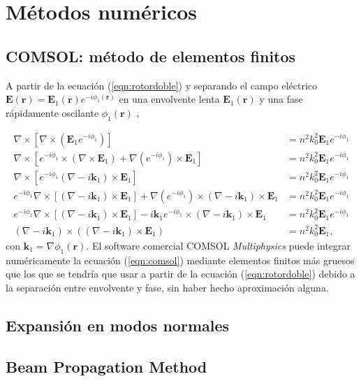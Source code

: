 \chapter{Métodos numéricos}
\section{COMSOL: método de elementos finitos}
A partir de la ecuación (\ref{eqn:rotordoble}) y separando el campo eléctrico $\textbf{E}(\textbf{r}) = \textbf{E}_1(\textbf{r}) e^{-i \phi_1 (\textbf{r})}$ en una envolvente lenta $\textbf{E}_1(\textbf{r})$ y una fase rápidamente oscilante $\phi_1 (\textbf{r})$ ,

\begin{align}
\nabla\times[\nabla\times(\textbf{E}_1 e^{-i \phi_1 })] &=  n^2k_0^2 \textbf{E}_1 e^{-i \phi_1} \nonumber
\\
\nabla\times[ e^{-i \phi_1} \times (\nabla \times \textbf{E}_1) + \nabla(e^{-i \phi_1})\times \textbf{E}_1] &=  n^2k_0^2 \textbf{E}_1 e^{-i \phi_1}\nonumber
\\
\nabla\times[ e^{-i \phi_1}  (\nabla  - i  \textbf{k} _1)\times\textbf{E}_1  ] &=  n^2k_0^2 \textbf{E}_1 e^{-i \phi_1}\nonumber
\\
e^{-i \phi_1}  \nabla\times[ (\nabla  - i  \textbf{k} _1)\times\textbf{E}_1] + \nabla(e^{-i \phi_1})\times  (\nabla  - i  \textbf{k} _1)\times\textbf{E}_1  &=  n^2k_0^2 \textbf{E}_1 e^{-i \phi_1}\nonumber
\\
e^{-i \phi_1}  \nabla\times[ (\nabla  - i  \textbf{k} _1)\times\textbf{E}_1] - i\textbf{k}_1 e^{-i \phi_1}\times  (\nabla  - i  \textbf{k} _1)\times\textbf{E}_1  &=  n^2k_0^2 \textbf{E}_1 e^{-i \phi_1}\nonumber
\\
	(\nabla-i\textbf{k}_1)\times((\nabla-i\textbf{k}_1)\times \textbf{E}_1) &= n^2k_0^2 \textbf{E}_1,
	 \label{eqn:comsol}
\end{align}
con $\textbf{k}_1 = \nabla\phi_1(\textbf{r})$.
El software comercial COMSOL \textit{Multiphysics} puede integrar numéricamente la ecuación (\ref{eqn:comsol})  mediante elementos finitos más gruesos que los que se tendría que usar a partir de la ecuación (\ref{eqn:rotordoble}) debido a la separación entre envolvente y fase, sin haber hecho aproximación alguna.

\section{Expansión en modos normales}

\section{Beam Propagation Method} 

